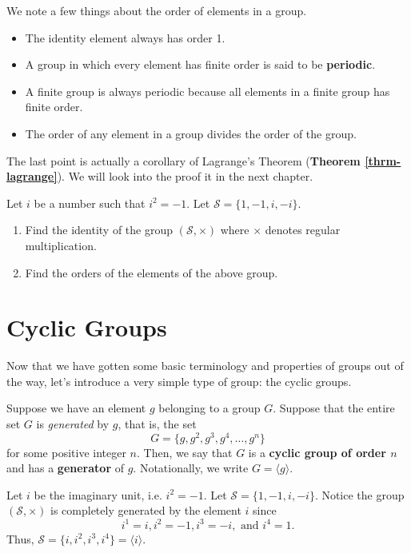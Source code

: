 We note a few things about the order of elements in a group.
\begin{itemize}
    \item The identity element always has order 1.
    \item A group in which every element has finite order is said to be \textbf{periodic}.
    \item A finite group is always periodic because all elements in a finite group has finite order.
    \item The order of any element in a group divides the order of the group.
\end{itemize}
The last point is actually a corollary of Lagrange's Theorem (\textbf{Theorem \ref{thrm-lagrange}}). We will look into the proof it in the next chapter.

\begin{exercise}
    Let $i$ be a number such that $i^2 = -1$. Let $\mathcal{S} = \{1, -1, i, -i\}$.
    \begin{enumerate}[label=(\roman*)]
        \item Find the identity of the group $(\mathcal{S}, \times)$ where $\times$ denotes regular multiplication.
        \item Find the orders of the elements of the above group.
    \end{enumerate}
\end{exercise}

\section{Cyclic Groups}
Now that we have gotten some basic terminology and properties of groups out of the way, let's introduce a very simple type of group: the cyclic groups.

Suppose we have an element $g$ belonging to a group $G$. Suppose that the entire set $G$ is \textit{generated} by $g$, that is, the set
\[
    G = \{g, g^2, g^3, g^4, \dots, g^n\}
\]
for some positive integer $n$. Then, we say that $G$ is a \textbf{cyclic group of order $n$} and has a \textbf{generator} of $g$. Notationally, we write $G = \langle g \rangle$.

\begin{example}
    Let $i$ be the imaginary unit, i.e. $i^2 = -1$. Let $\mathcal{S} = \{1, -1, i, -i\}$. Notice the group $(\mathcal{S}, \times)$ is completely generated by the element $i$ since
    \[
    i^1 = i, i^2 = -1, i^3 = -i, \text{ and } i^4 = 1.
    \]
    Thus, $\mathcal{S} = \{i, i^2, i^3, i^4\} = \langle i \rangle$.
\end{example}

